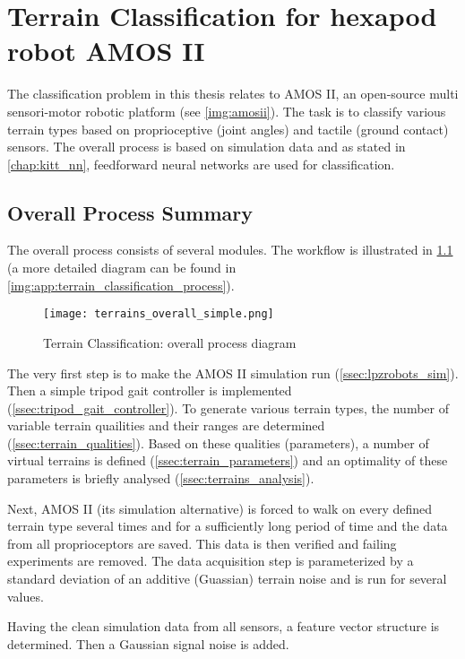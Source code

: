 \chapter{Terrain Classification for hexapod robot AMOS II} \label{chap:terrain_classification}

The classification problem in this thesis relates to AMOS II, an open-source multi sensori-motor robotic platform (see \cref{img:amosii}). The task is to classify various terrain types based on proprioceptive (joint angles) and tactile (ground contact) sensors. The overall process is based on simulation data and as stated in \cref{chap:kitt_nn}, feedforward neural networks are used for classification.

\section{Overall Process Summary} \label{sec:overall_process_summary}
The overall process consists of several modules. The workflow is illustrated in \cref{img:terrain_overall_simple} (a more detailed diagram can be found in \cref{img:app:terrain_classification_process}).

\begin{figure}[H]
  \centering
  \texttt{[image: terrains\_overall\_simple.png]}
  \caption{Terrain Classification: overall process diagram}
  \label{img:terrain_overall_simple}
\end{figure}

The very first step is to make the AMOS II simulation run (\cref{ssec:lpzrobots_sim}). Then a simple tripod gait controller is implemented (\cref{ssec:tripod_gait_controller}). To generate various terrain types, the number of variable terrain quailities and their ranges are determined (\cref{ssec:terrain_qualities}). Based on these qualities (parameters), a number of virtual terrains is defined (\cref{ssec:terrain_parameters}) and an optimality of these parameters is briefly analysed (\cref{ssec:terrains_analysis}).

Next, AMOS II (its simulation alternative) is forced to walk on every defined terrain type several times and for a sufficiently long period of time and the data from all proprioceptors are saved. This data is then verified and failing experiments are removed. The data acquisition step is parameterized by a standard deviation of an additive (Guassian) terrain noise and is run for several values.

Having the clean simulation data from all sensors, a feature vector structure is determined. Then a Gaussian signal noise is added. 

